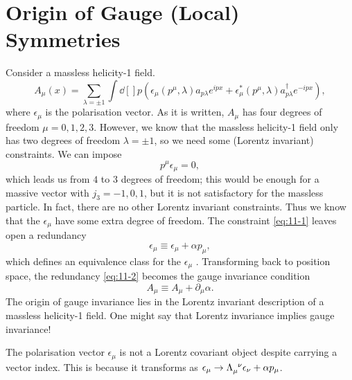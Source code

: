 
\section{Origin of Gauge (Local) Symmetries}%
\label{sec:origin_of_gauge_local_symmetries}

Consider a massless helicity-1 field.
\begin{equation}
  A_{\mu}(x) = \sum_{\lambda=\pm 1} \int \dd[]{p} \left( \epsilon_{\mu}(p^{\mu}, \lambda) a_{p \lambda} e^{i p x} + \epsilon^*_{\mu} (p^{\mu}, \lambda) a^{\dagger}_{p \lambda} e^{-i p x} \right),
\end{equation}
where $\epsilon_{\mu}$  is the polarisation vector.
As it is written, $A_{\mu}$  has four degrees of freedom $\mu = 0,1,2,3$.
However, we know that the massless helicity-1 field only has two degrees of freedom $\lambda = \pm 1$, so we need some (Lorentz invariant) constraints. We can impose
\begin{equation}
  \label{eq:11-1}
  p^{\mu} \epsilon_{\mu} = 0,
\end{equation}
which leads us from $4$  to $3$  degrees of freedom; this would be enough for a massive vector with $j_3 = -1, 0, 1$, but it is not satisfactory for the massless particle. 
In fact, there are no other Lorentz invariant constraints. Thus we know that the $\epsilon_{\mu}$  have some extra degree of freedom. The constraint \eqref{eq:11-1} leaves open a redundancy
\begin{equation}
  \label{eq:11-2}
  \epsilon_{\mu} \equiv \epsilon_{\mu} + \alpha p_{\mu},
\end{equation}
which defines an equivalence class for the $\epsilon_{\mu}$ .
Transforming back to position space, the redundancy \eqref{eq:11-2} becomes the gauge invariance condition
\begin{equation}
  A_{\mu} \equiv A_{\mu} + \partial_{\mu} \alpha.
\end{equation}
The origin of gauge invariance lies in the Lorentz invariant description of a massless helicity-1 field.
One might say that Lorentz invariance implies gauge invariance!
\begin{remark}
  The polarisation vector $\epsilon_{\mu}$ is not a Lorentz covariant object despite carrying a vector index.
  This is because it transforms as $\epsilon_{\mu} \to \Lambda\indices{_{\mu}^{\nu}} \epsilon_{\nu} + \alpha p_{\mu}$.
\end{remark}


